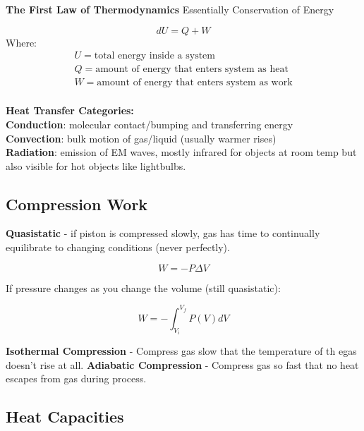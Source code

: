 \documentclass[11pt]{article}
\theoremstyle{definition}
\begin{document}
\begin{shaded}
\textbf{The First Law of Thermodynamics}\newline 
Essentially Conservation of Energy

\begin{equation}
dU = Q + W
\end{equation}
Where:
\begin{equation*}
\begin{split}
U = \text{total energy inside a system} \\
Q = \text{amount of energy that enters system as heat} \\
W = \text{amount of energy that enters system as work}\\
\end{split}
\end{equation*}
\end{shaded}


\textbf{Heat Transfer Categories:} \\
\textbf{Conduction}: molecular contact/bumping and transferring energy \\
\textbf{Convection}: bulk motion of gas/liquid (usually warmer rises) \\
\textbf{Radiation}: emission of EM waves, mostly infrared for objects at room temp but also visible for hot objects like lightbulbs.


\subsection{Compression Work}
\textbf{Quasistatic} - if piston is compressed slowly, gas has time to continually equilibrate to changing conditions (never perfectly).

\begin{equation}
W = -P \Delta V
\end{equation}

If pressure changes as you change the volume (still quasistatic):

\begin{equation}
    W = - \int_{V_i}^{V_f} P(V) dV
\end{equation}

\textbf{Isothermal Compression} - Compress gas slow that the temperature of th egas doesn't rise at all.
\textbf{Adiabatic Compression} - Compress gas so fast that no heat escapes from gas during process.

\subsection{Heat Capacities}
\end{document}
